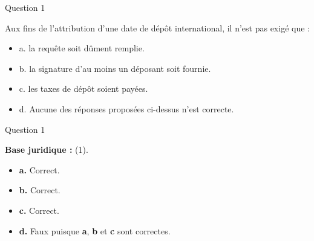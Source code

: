 \begin{frame}{Question 1}

\begin{block}{}
Aux fins de l’attribution d’une date de dépôt international, il n’est pas exigé que :

\begin{itemize}
  \item[$\bullet$] a. la requête soit dûment remplie. 
  \item[$\bullet$] b. la signature d’au moins un déposant soit fournie. 
  \item[$\bullet$] c. les taxes de dépôt soient payées. 
  \item[$\circ$] d. Aucune des réponses proposées ci-dessus n’est correcte. 
\end{itemize}

\end{block}

\end{frame}

\begin{frame}{Question 1}

\textbf{Base juridique :} (1).  

\begin{itemize}
  \item[$\bullet$] \textbf{a.} \; Correct.

  \item[$\bullet$] \textbf{b.} \; Correct.

  \item[$\bullet$] \textbf{c.} \; Correct.

  \item[$\circ$] \textbf{d.} \; Faux puisque \textbf{a}, \textbf{b} et \textbf{c} sont correctes.
\end{itemize}

\end{frame}